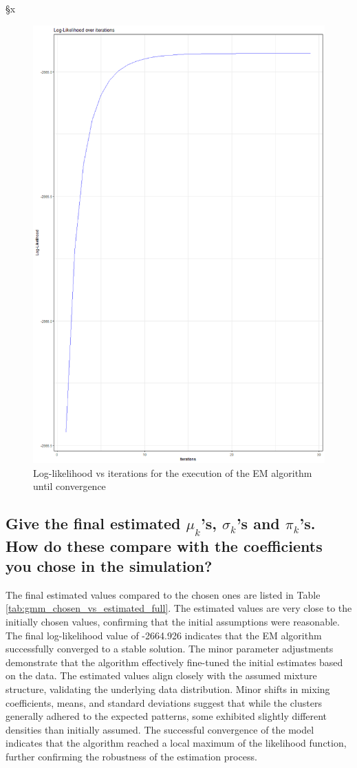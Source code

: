 §x\documentclass[]{article}
\begin{document}
\begin{figure}[H]
	\centering
	\includegraphics[width=0.7\linewidth]{img/img-5-3}
	\caption{Log-likelihood vs iterations for the execution of the EM algorithm until convergence}
	\label{fig:img-5-3}
\end{figure}

\subsection{Give the final estimated $\mu_k$'s, $\sigma_k$'s and $\pi_k$'s. How do these compare with the coefficients you chose in the simulation?
}


The final estimated values compared to the chosen ones are listed in Table \ref{tab:gmm_chosen_vs_estimated_full}. The estimated values are very close to the initially chosen values, confirming that the initial assumptions were reasonable. The final log-likelihood value of -2664.926 indicates that the EM algorithm successfully converged to a stable solution. The minor parameter adjustments demonstrate that the algorithm effectively fine-tuned the initial estimates based on the data. The estimated values align closely with the assumed mixture structure, validating the underlying data distribution. Minor shifts in mixing coefficients, means, and standard deviations suggest that while the clusters generally adhered to the expected patterns, some exhibited slightly different densities than initially assumed. The successful convergence of the model indicates that the algorithm reached a local maximum of the likelihood function, further confirming the robustness of the estimation process.
\end{document}
